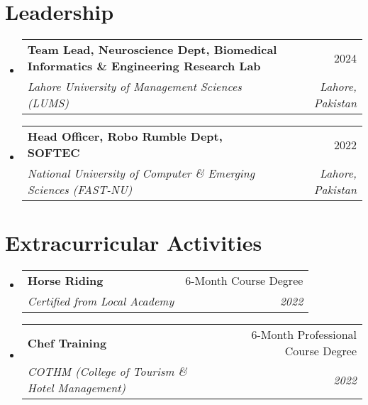 \documentclass[letterpaper,10pt]{article}
\makeatletter
\newcommand{\resumeSubheading}[4]{
  \vspace{-1pt}\item
    \begin{tabular*}{0.97\textwidth}[t]{l@{\extracolsep{\fill}}r}
      \textbf{#1} & #2 \\
      \textit{\small#3} & \textit{\small #4} \\
    \end{tabular*}\vspace{-5pt}
}
\newcommand{\resumeSubHeadingListStart}{\begin{itemize}[leftmargin=*]}
\newcommand{\resumeSubHeadingListEnd}{\end{itemize}}
\makeatother
\begin{document}
\section{Leadership}
 \resumeSubHeadingListStart
    \resumeSubheading
        {Team Lead, Neuroscience Dept, Biomedical Informatics \& Engineering Research Lab}{2024}
        {Lahore University of Management Sciences (LUMS)}{Lahore, Pakistan}
    \resumeSubheading
        {Head Officer, Robo Rumble Dept, SOFTEC}{2022}
        {National University of Computer \& Emerging Sciences (FAST-NU)}{Lahore, Pakistan}
 \resumeSubHeadingListEnd

\section{Extracurricular Activities}
 \resumeSubHeadingListStart
    \resumeSubheading
        {Horse Riding}{6-Month Course Degree}
        {Certified from Local Academy}{2022}
    \resumeSubheading
        {Chef Training}{6-Month Professional Course Degree}
        {COTHM (College of Tourism \& Hotel Management)}{2022}
 \resumeSubHeadingListEnd

\end{document}
